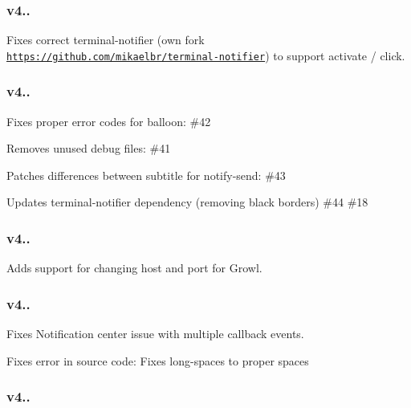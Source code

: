 \subsubsection*{{\ttfamily v4..}}


\begin{DoxyEnumerate}
\item Fixes correct terminal-\/notifier (own fork \href{https://github.com/mikaelbr/terminal-notifier}{\tt https\+://github.\+com/mikaelbr/terminal-\/notifier}) to support activate / click.
\end{DoxyEnumerate}

\subsubsection*{{\ttfamily v4..}}


\begin{DoxyEnumerate}
\item Fixes proper error codes for balloon\+: \#42
\item Removes unused debug files\+: \#41
\item Patches differences between subtitle for notify-\/send\+: \#43
\item Updates terminal-\/notifier dependency (removing black borders) \#44 \#18
\end{DoxyEnumerate}

\subsubsection*{{\ttfamily v4..}}


\begin{DoxyEnumerate}
\item Adds support for changing host and port for Growl.
\end{DoxyEnumerate}

\subsubsection*{{\ttfamily v4..}}


\begin{DoxyEnumerate}
\item Fixes Notification center issue with multiple callback events.
\item Fixes error in source code\+: Fixes long-\/spaces to proper spaces
\end{DoxyEnumerate}

\subsubsection*{{\ttfamily v4..}}


